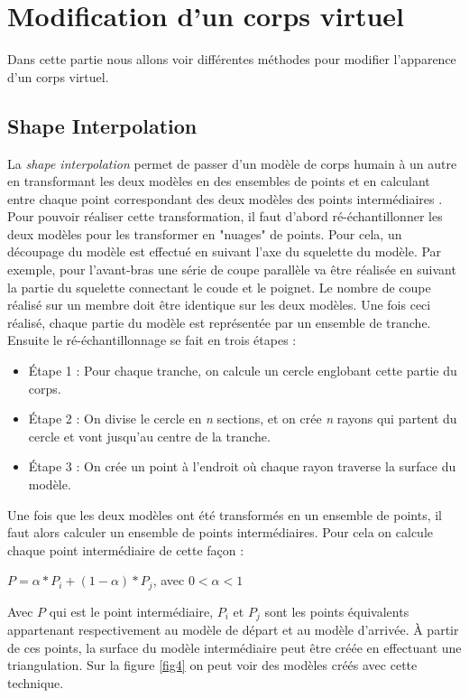 \section{Modification d'un corps virtuel}
Dans cette partie nous allons voir différentes méthodes pour modifier l'apparence d'un corps virtuel.

\subsection{Shape Interpolation}

La \emph{shape interpolation} permet de passer d'un modèle de corps humain à un autre en transformant les deux modèles en des ensembles de points et en calculant entre chaque point correspondant des deux modèles des points intermédiaires \cite{zh09}. Pour pouvoir réaliser cette transformation, il faut d'abord ré-échantillonner les deux modèles pour les transformer en "nuages" de points. Pour cela, un découpage du modèle est effectué en suivant l'axe du squelette du modèle. Par exemple, pour l'avant-bras une série de coupe parallèle va être réalisée en suivant la partie du squelette connectant le coude et le poignet. Le nombre de coupe réalisé sur un membre doit être identique sur les deux modèles. Une fois ceci réalisé, chaque partie du modèle est représentée par un ensemble de tranche. Ensuite le ré-échantillonnage se fait en trois étapes :
\begin{itemize}
\item \'{E}tape 1 : Pour chaque tranche, on calcule un cercle englobant cette partie du corps.
\item \'{E}tape 2 : On divise le cercle en \emph{n} sections, et on crée \emph{n} rayons qui partent du cercle et vont jusqu'au centre de la tranche.
\item \'{E}tape 3 : On crée un point à l'endroit où chaque rayon traverse la surface du modèle.
\end{itemize}
Une fois que les deux modèles ont été transformés en un ensemble de points, il faut alors calculer un ensemble de points intermédiaires. Pour cela on calcule chaque point intermédiaire de cette façon :
\begin{center}
$P = \alpha*P_i + (1-\alpha)*P_j$, avec $0<\alpha<1$
\end{center}
Avec $P$ qui est le point intermédiaire, $P_i$ et $P_j$ sont les points équivalents appartenant respectivement au modèle de départ et au modèle d'arrivée. \`{A} partir de ces points, la surface du modèle intermédiaire peut être créée en effectuant une triangulation. Sur la figure \ref{fig4} on peut voir des modèles créés avec cette technique.
